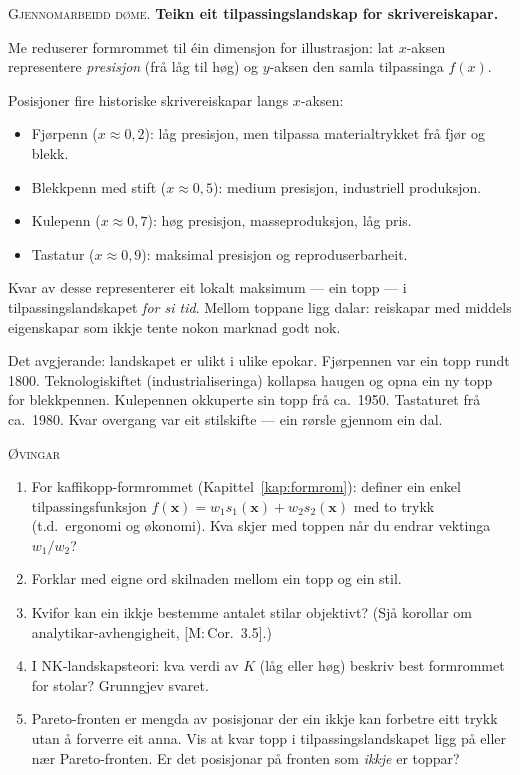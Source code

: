 \documentclass[10pt]{book}
\theoremstyle{definition}
\theoremstyle{plain}
\theoremstyle{remark}
\newenvironment{gjennomgang}%
  {\medskip\noindent\textsc{Gjennomarbeidd d\o me.}\enspace}%
  {\medskip}
\newenvironment{ovingar}%
  {\medskip\noindent\textsc{\O vingar}\begin{enumerate}[leftmargin=2em]}%
  {\end{enumerate}\medskip}
\newcommand{\Mref}[1]{\textnormal{[M:\,#1]}}
\begin{document}
\begin{gjennomgang}
\textbf{Teikn eit tilpassingslandskap for skrivereiskapar.}

Me reduserer formrommet til \' ein dimensjon for illustrasjon: lat $x$-aksen representere \emph{presisjon} (fr\aa{} l\aa g til h\o g) og $y$-aksen den samla tilpassinga $f(x)$.

Posisjoner fire historiske skrivereiskapar langs $x$-aksen:
\begin{itemize}[nosep]
  \item Fj\o rpenn ($x \approx 0{,}2$): l\aa g presisjon, men tilpassa materialtrykket fr\aa{} fj\o r og blekk.
  \item Blekkpenn med stift ($x \approx 0{,}5$): medium presisjon, industriell produksjon.
  \item Kulepenn ($x \approx 0{,}7$): h\o g presisjon, masseproduksjon, l\aa g pris.
  \item Tastatur ($x \approx 0{,}9$): maksimal presisjon og reproduserbarheit.
\end{itemize}

Kvar av desse representerer eit lokalt maksimum --- ein topp --- i tilpassingslandskapet \emph{for si tid}. Mellom toppane ligg dalar: reiskapar med middels eigenskapar som ikkje tente nokon marknad godt nok.

Det avgjerande: landskapet er ulikt i ulike epokar. Fj\o rpennen var ein topp rundt 1800. Teknologiskiftet (industrialiseringa) kollapsa haugen og opna ein ny topp for blekkpennen. Kulepen\-nen okkuperte sin topp fr\aa{} ca.\ 1950. Tastaturet fr\aa{} ca.\ 1980. Kvar overgang var eit stilskifte --- ein r\o rsle gjennom ein dal.
\end{gjennomgang}

\begin{ovingar}
  \item[\textbf{a)}] For kaffikopp-formrommet (Kapittel~\ref{kap:formrom}): definer ein enkel tilpassingsfunksjon $f(\bm{x}) = w_1 s_1(\bm{x}) + w_2 s_2(\bm{x})$ med to trykk (t.d.\ ergonomi og \o konomi). Kva skjer med toppen n\aa r du endrar vektinga $w_1 / w_2$?
  \item[\textbf{a)}] Forklar med eigne ord skilnaden mellom ein topp og ein stil.
  \item[\textbf{b)}] Kvifor kan ein ikkje bestemme antalet stilar objektivt? (Sjå korollar om analytikar-avhengigheit, \Mref{Cor.~3.5}.)
  \item[\textbf{b)}] I NK-landskapsteori: kva verdi av $K$ (l\aa g eller h\o g) beskriv best formrommet for stolar? Grunngjev svaret.
  \item[\textbf{c)}] Pareto-fronten er mengda av posisjonar der ein ikkje kan forbetre eitt trykk utan \aa{} forverre eit anna. Vis at kvar topp i tilpassingslandskapet ligg p\aa{} eller n\ae r Pareto-fronten. Er det posisjonar p\aa{} fronten som \emph{ikkje} er toppar?
\end{ovingar}
\end{document}
